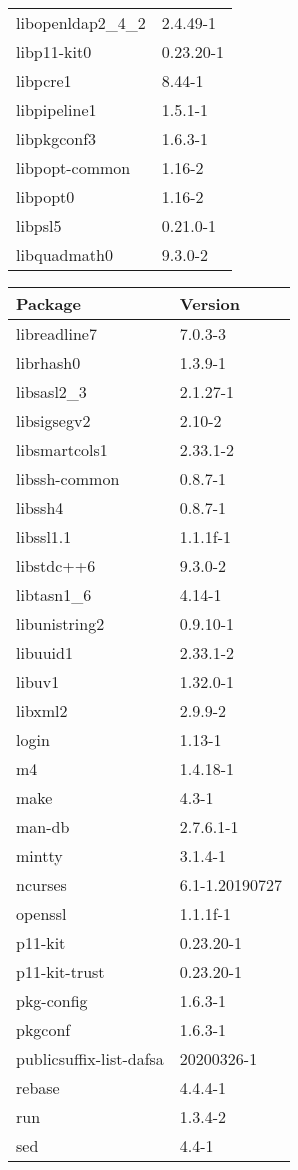 \documentclass[10pt, english, openany]{report}
\begin{document}
\begin{appendices}
\begin{center}
\begin{tabular}{|m{3cm}|m{3cm}|}
libopenldap2\_4\_2 & 2.4.49-1 \\
libp11-kit0 & 0.23.20-1 \\
libpcre1 & 8.44-1 \\
libpipeline1 & 1.5.1-1 \\
libpkgconf3 & 1.6.3-1 \\
libpopt-common & 1.16-2 \\
libpopt0 & 1.16-2 \\
libpsl5 & 0.21.0-1 \\
libquadmath0 & 9.3.0-2 \\
\hline
\end{tabular}
\newpage
\begin{tabular}{|m{3cm}|m{3cm}|}
Package & Version \\
\hline
libreadline7 & 7.0.3-3 \\
librhash0 & 1.3.9-1 \\
libsasl2\_3 & 2.1.27-1 \\
libsigsegv2 & 2.10-2 \\
libsmartcols1 & 2.33.1-2 \\
libssh-common & 0.8.7-1 \\
libssh4 & 0.8.7-1 \\
libssl1.1 & 1.1.1f-1 \\
libstdc++6 & 9.3.0-2 \\
libtasn1\_6 & 4.14-1 \\
libunistring2 & 0.9.10-1 \\
libuuid1 & 2.33.1-2 \\
libuv1 & 1.32.0-1 \\
libxml2 & 2.9.9-2 \\
login & 1.13-1 \\
m4 & 1.4.18-1 \\
make & 4.3-1 \\
man-db & 2.7.6.1-1 \\
mintty & 3.1.4-1 \\
ncurses & 6.1-1.20190727 \\
openssl & 1.1.1f-1 \\
p11-kit & 0.23.20-1 \\
p11-kit-trust & 0.23.20-1 \\
pkg-config & 1.6.3-1 \\
pkgconf & 1.6.3-1 \\
publicsuffix-list-dafsa & 20200326-1 \\
rebase & 4.4.4-1 \\
run & 1.3.4-2 \\
sed & 4.4-1 \\

\end{tabular}
\end{center}
\end{appendices}
\end{document}
